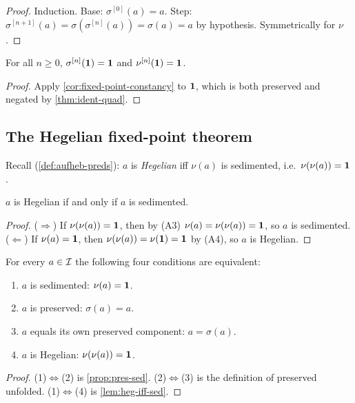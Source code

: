 \begin{proof}
Induction. Base: $\sigma^{[0]}(a)=a$. Step: $\sigma^{[n+1]}(a)
=\sigma(\sigma^{[n]}(a))=\sigma(a)=a$ by hypothesis. Symmetrically
for $\nu$.
\end{proof}

\begin{corollary}\label{cor:ident-orbit}
For all $n\geq 0$, $\sigma^{[n]}(\mathbf{1})=\mathbf{1}$ and
$\nu^{[n]}(\mathbf{1})=\mathbf{1}$.
\end{corollary}

\begin{proof}
Apply \cref{cor:fixed-point-constancy} to $\mathbf{1}$, which is both
preserved and negated by \cref{thm:ident-quad}.
\end{proof}

\subsection*{The Hegelian fixed-point theorem}

Recall (\cref{def:aufheb-preds}): $a$ is \emph{Hegelian} iff $\nu(a)$
is sedimented, i.e.\ $\nu(\nu(a))=\mathbf{1}$.

\begin{lemma}[Hegelian = Sedimented]\label{lem:heg-iff-sed}
$a$ is Hegelian if and only if $a$ is sedimented.
\end{lemma}

\begin{proof}
($\Rightarrow$) If $\nu(\nu(a))=\mathbf{1}$, then by (A3) $\nu(a)=\nu(\nu(a))
=\mathbf{1}$, so $a$ is sedimented. ($\Leftarrow$) If $\nu(a)=\mathbf{1}$, then
$\nu(\nu(a))=\nu(\mathbf{1})=\mathbf{1}$ by (A4), so $a$ is Hegelian.
\end{proof}

\begin{theorem}\label{thm:3-3}
For every $a\in\mathcal{I}$ the following four conditions are equivalent:
\begin{enumerate}
\item $a$ is sedimented: $\nu(a)=\mathbf{1}$.
\item $a$ is preserved: $\sigma(a)=a$.
\item $a$ equals its own preserved component: $a=\sigma(a)$.
\item $a$ is Hegelian: $\nu(\nu(a))=\mathbf{1}$.
\end{enumerate}
\end{theorem}

\begin{proof}
(1)$\Leftrightarrow$(2) is \cref{prop:pres-sed}. (2)$\Leftrightarrow$(3)
is the definition of preserved unfolded. (1)$\Leftrightarrow$(4) is
\cref{lem:heg-iff-sed}.
\end{proof}

